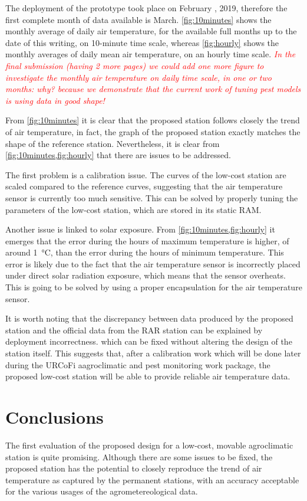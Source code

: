 \documentclass[authoryear,preprint,review,12pt]{elsarticle}
\newcommand{\note}[1]{\emph{\textcolor{red}{#1}}}
\begin{document}
The deployment of the prototype took place on February , 2019,  therefore the first complete month of data available is March. 
\cref{fig:10minutes} shows the monthly average of daily air temperature, for the available full months up to the date of this writing, on 10-minute time scale, whereas \cref{fig:hourly} shows the monthly averages of daily mean air temperature, on an hourly time scale.
\note{ In the final submission (having 2 more pages) we could add one more figure to investigate the monthly air temperature on daily time scale, in one or two months: why? because we demonstrate that the current work of tuning pest models is using data in good shape! }

From \cref{fig:10minutes} it is clear that the proposed station follows closely the trend of air temperature, in fact, the graph of the proposed station exactly matches the shape of the reference station. Nevertheless, it is clear from \cref{fig:10minutes,fig:hourly} that there are issues to be addressed. 

The first problem is a calibration issue. The curves of the low-cost station are scaled compared to the reference curves, suggesting that the air temperature sensor is currently too much sensitive. This can be solved by properly tuning the parameters of the low-cost station,  which are stored in its static RAM.

Another issue is linked to solar exposure.
From \cref{fig:10minutes,fig:hourly} it emerges that the error during the hours of maximum temperature is higher, of around \SI{1}{\celsius}, than the error during the hours of minimum temperature. 
This error is likely due to the fact that the air temperature sensor is incorrectly placed under direct solar radiation exposure, which means that the sensor overheats. 
This is going to be solved by using a proper encapsulation for the air temperature sensor.

It is worth noting that the discrepancy between data produced by the proposed station and the official data from the RAR station can be explained by deployment incorrectness. which can be fixed without altering the design of the station itself. This suggests that, after a calibration work which will be done later during the URCoFi aagroclimatic and pest monitoring work package, the proposed low-cost station will be able to provide reliable air temperature data.

\section{Conclusions}
The first evaluation of the proposed design for a low-cost, movable agroclimatic station is quite promising. Although there are some issues to be fixed, the proposed station has the potential to closely reproduce the trend of air temperature as captured by the permanent stations, with an accuracy acceptable for the various usages of the agrometereological data.
\end{document}
